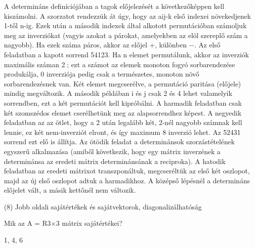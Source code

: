 \begin{frame}
  \begin{tcolorbox}[title={7/6. -R-}]
    A determináns deﬁníciójában a tagok előjelezését a következőképpen kell kiszámolni. A szorzatot rendezzük át úgy, hogy az aij-k első indexei növekedjenek 1-től n-ig. Ezek után a második indexek által alkotott permutációban számoljuk meg az inverziókat (vagyis azokat a párokat, amelyekben az elöl szereplő szám a nagyobb). Ha ezek száma páros, akkor az előjel +, különben −. Az első feladatban a kapott sorrend 54123. Ha n elemet permutálunk, akkor az inverziók maximális száman 2; ezt a számot az elemek monoton fogyó sorbarendezése produkálja, 0 inverziója pedig csak a természetes, monoton növő sorbarendezésnek van. Két elemet megcserélve, a permutáció paritása (előjele) mindig megváltozik. A második példában i és j csak 2 és 4 lehet valamelyik sorrendben, ezt a két permutációt kell kipróbálni. A harmadik feladatban csak két szomszédos elemet cserélhetünk meg az alapsorrendhez képest. A negyedik feladatban az az ötlet, hogy a 2 után legalább két, 2-nél nagyobb számnak kell lennie, ez két nem-inverziót elront, és így maximum 8 inverzió lehet. Az 52431 sorrend ezt elő is állítja. Az ötödik feladat a determinánsok szorzástételének egyszerű alkalmazása (amiből következik, hogy egy mátrix inverzének a determinánsa az eredeti mátrix determinánsának a reciproka). A hatodik feladatban az eredeti mátrixot transzponáltuk, megcseréltük az első két oszlopot, majd az új első oszlopot adtuk a harmadikhoz. A középső lépésnél a determináns előjelet vált, a másik kettőnél nem változik.

  \end{tcolorbox}
\end{frame}


\begin{frame}[plain]
\begin{tcolorbox}[center, colback={myyellow}, coltext={black}, colframe={myyellow}]
    {\RHuge  (8) Jobb oldali sajátértékek és sajátvektorok, diagonalizálhatóság}
    \mmedskip
\end{tcolorbox}
\end{frame}

\begin{frame}
  \begin{tcolorbox}[title={8/1. -N-}]
    Mik az A = R3×3 mátrix sajátértékei? 

  \tcblower

    \mmedskip 
    
    1, 4, 6
  \end{tcolorbox}
\end{frame}


